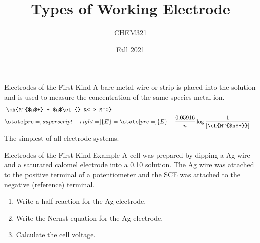 \documentclass[notes=only]{beamer}
\title{Types of Working Electrode}
\author{CHEM321}
\date{Fall 2021}
\begin{document}
\maketitle

\begin{frame}{Electrodes of the First Kind}
		A bare metal wire or strip is placed into
			the solution and is used to measure the
			concentration of the same species metal
			ion.
			\begin{align*}
				\ch{M^{$n$+} + $n$\el{} &<=>
				M^0} \\
				\state[pre=,superscript-right=]{E}
				&= \state[pre=]{E} -
				\frac{0.05916}{n} \log
				\frac{1}{[\ch{M^{$n$+}}]}
			\end{align*}
		The simplest of all electrode systems.
\end{frame}

\begin{frame}[t]{Electrodes of the First Kind Example}
	A cell was prepared by dipping a Ag wire and a saturated calomel
	electrode into a \SI{0.10}{\Molar}  solution. The Ag wire was
	attached to the positive terminal of a potentiometer and the SCE was
	attached to the negative (reference) terminal.
	\begin{enumerate}
		\item Write a half-reaction for the Ag electrode.
		\item Write the Nernst equation for the Ag electrode.
		\item Calculate the cell voltage.
			\visible<2->{\textbf{Activity?}}
	\end{enumerate}

\end{frame}
\end{document}
